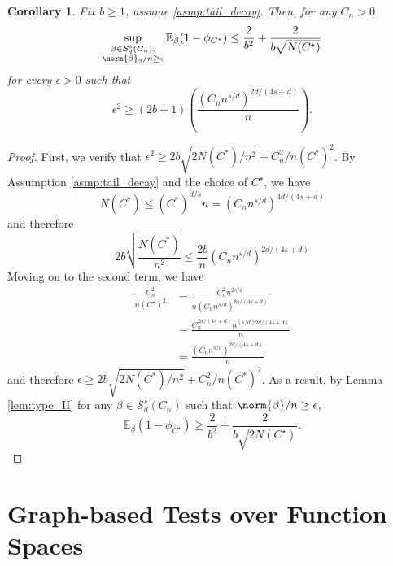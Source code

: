 \documentclass{article}
\newcommand{\1}{\mathbf{1}}
\newcommand{\Ebb}{\mathbb{E}}
\theoremstyle{alden}
\theoremstyle{aldenthm}
\newtheorem{corollary}{Corollary}
\theoremstyle{definition}
\theoremstyle{remark}
\begin{document}
\begin{corollary}
	\label{cor:critical_radius}
	Fix $b \geq 1$, assume \ref{asmp:tail_decay}. Then, for any $C_n > 0$
	\begin{equation*}
	\sup_{\substack{\beta \in \mathcal{S}_d^{s}(C_n), \\ \norm{\beta}_2/n \geq \epsilon}} \Ebb_{\beta}(1 - \phi_{C^{\star}}) \leq \frac{2}{b^2} + \frac{2}{b\sqrt{N(C^{\star})}}
	\end{equation*}
	for every $\epsilon > 0$ such that 
	\begin{equation*}
	\epsilon^2 \geq (2b + 1) \left(\frac{(C_n n^{s/d})^{2d/(4s + d)}}{n}\right).
	\end{equation*}
\end{corollary}
\begin{proof}
	First, we verify that $\epsilon^2 \geq 2b\sqrt{2N(C^*)/n^2} + C_n^2/n(C^*)^2$. By Assumption \ref{asmp:tail_decay} and the choice of $C^{\star}$, we have
	\begin{equation*}
	N(C^*) \leq (C^*)^{d/s}n = (C_n n^{s/d})^{4d/(4s + d)}
	\end{equation*}
	and therefore
	\begin{equation*}
	2b\sqrt{\frac{N(C^*)}{n^2}} \leq \frac{2b}{n} (C_n n^{s/d})^{2d/(4s+d)}
	\end{equation*}
	Moving on to the second term, we have
	\begin{align*}
	\frac{C_n^2}{n(C^{\star})^2} & = \frac{C_n^2n^{2s/d}}{n(C_nn^{s/d})^{8s/(4s+d)}} \\
	& = \frac{C_n^{2d/(4s + d)}n^{(s/d)2d/(4s + d)}}{n} \\
	& = \frac{(C_n n^{s/d})^{2d/(4s + d)}}{n}
	\end{align*}
	and therefore $\epsilon \geq 2b\sqrt{2N(C^*)/n^2} + C_n^2/n(C^*)^2$. As a result, by Lemma \ref{lem:type_II} for any $\beta \in \mathcal{S}^s_d(C_n)$ such that $\norm{\beta}/n \geq \epsilon$, 
	\begin{equation*}
	\Ebb_{\beta}(1 - \phi_{C^{\star}}) \geq \frac{2}{b^2} + \frac{2}{b\sqrt{2N(C^{\star})}}.
	\end{equation*}
\end{proof}

\section{Graph-based Tests over Function Spaces}
\end{document}
